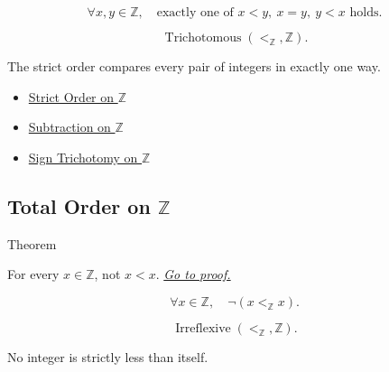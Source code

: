 \begin{remark*}
\[
\forall x,y\in\mathbb{Z},\quad
\text{exactly one of }x<y,\ x=y,\ y<x\text{ holds}.
\]
\end{remark*}

\begin{remark*}
\[
\operatorname{Trichotomous}(<_{\mathbb{Z}},\mathbb{Z}).
\]
\end{remark*}

\begin{remark*}[Interpretation]
The strict order compares every pair of integers in exactly one way.
\end{remark*}

\begin{dependencies}
\begin{itemize}
  \item \hyperref[def:strict-order-on-z]{Strict Order on $\mathbb{Z}$}
  \item \hyperref[def:subtraction-on-z]{Subtraction on $\mathbb{Z}$}
  \item \hyperref[thm:sign-trichotomy-on-z]{Sign Trichotomy on $\mathbb{Z}$}
\end{itemize}
\end{dependencies}

\subsection*{\texorpdfstring{Total Order on $\mathbb{Z}$}{Total Order on Z}}

\begin{theorembox}{Theorem}
\begin{theorem}
\label{thm:strict-order-on-z-irreflexive}
For every $x\in\mathbb{Z}$, not $x<x$.
\hyperref[prf:strict-order-on-z-irreflexive]{\textit{Go to proof.}}
\end{theorem}
\end{theorembox}

\begin{remark*}
\[
\forall x\in\mathbb{Z},\quad \neg(x<_{\mathbb{Z}}x).
\]
\end{remark*}

\begin{remark*}
\[
\operatorname{Irreflexive}(<_{\mathbb{Z}},\mathbb{Z}).
\]
\end{remark*}

\begin{remark*}[Interpretation]
No integer is strictly less than itself.
\end{remark*}

